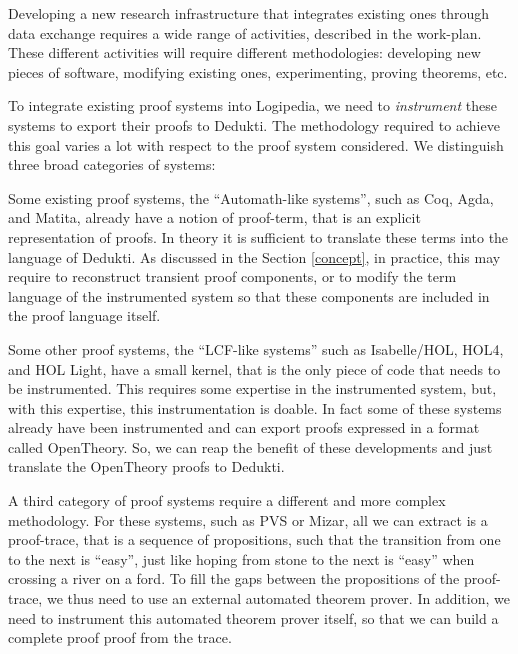 Developing a new research infrastructure that integrates existing
ones through data exchange requires a wide range of activities,
described in the work-plan. These different activities will require
different methodologies: developing new pieces of software,
modifying existing ones, experimenting, proving theorems, etc.


To integrate existing proof systems into Logipedia, we need to
\emph{instrument} these systems to export their proofs to Dedukti. The
methodology required to achieve this goal varies a lot with respect to
the proof system considered. We distinguish three broad categories of
systems:

\begin{compactitem}
\item
Some existing proof systems, the ``Automath-like systems'', such as Coq, Agda, and
Matita, already have a notion of proof-term, that is an explicit
representation of proofs.  In theory it is sufficient to translate
these terms into the language of Dedukti.  As discussed in the Section
\ref{concept}, in practice, this may require to reconstruct transient
proof components, or to modify the term language of the instrumented
system so that these components are included in the proof language
itself.

\item
Some other proof systems, the ``LCF-like systems'' such as
Isabelle/HOL, HOL4, and HOL Light, have a small kernel, that is the
only piece of code that needs to be instrumented. This requires some
expertise in the instrumented system, but, with this expertise, this
instrumentation is doable. In fact some of these systems already have
been instrumented and can export proofs expressed in a format called
OpenTheory. So, we can reap the benefit of these developments and just
translate the OpenTheory proofs to Dedukti.

\item A third category of proof systems require a different and more
complex methodology. For these systems, such as PVS or Mizar, all we
can extract is a proof-trace, that is a sequence of propositions, such
that the transition from one to the next is ``easy'', just like hoping
from stone to the next is ``easy'' when crossing a river on a ford. To
fill the gaps between the propositions of the proof-trace, we thus
need to use an external automated theorem prover. In addition, we need
to instrument this automated theorem prover itself, so that we can
build a complete proof proof from the trace.
\end{compactitem}

